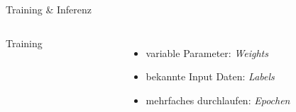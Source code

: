 \begin{frame}{Training \& Inferenz}
    \begin{columns}[T]
        Training
        \begin{figure}
            \centering
            \def\svgwidth{0.8\columnwidth}
            
        \end{figure}
        \begin{itemize}
            \item variable Parameter: \textit{Weights}
            \item bekannte Input Daten: \textit{Labels}
            \item mehrfaches durchlaufen: \textit{Epochen}
        \end{itemize}
    \end{columns}
\end{frame}


